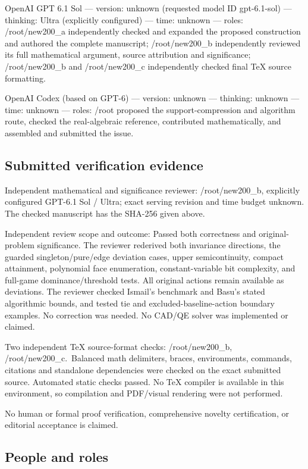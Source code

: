 \documentclass[11pt]{article}
\theoremstyle{remark}
\begin{document}
OpenAI GPT 6.1 Sol  —  version: unknown (requested model ID gpt-6.1-sol)  —  thinking: Ultra (explicitly configured)  —  time: unknown  —  roles: /root/new200\_a independently checked and expanded the proposed construction and authored the complete manuscript; /root/new200\_b independently reviewed its full mathematical argument, source attribution and significance; /root/new200\_b and /root/new200\_c independently checked final TeX source formatting.

OpenAI Codex (based on GPT-6)  —  version: unknown  —  thinking: unknown  —  time: unknown  —  roles: /root proposed the support-compression and algorithm route, checked the real-algebraic reference, contributed mathematically, and assembled and submitted the issue.

\subsection{Submitted verification evidence}

Independent mathematical and significance reviewer: /root/new200\_b, explicitly configured GPT-6.1 Sol / Ultra; exact serving revision and time budget unknown. The checked manuscript has the SHA-256 given above.

Independent review scope and outcome: Passed both correctness and original-problem significance. The reviewer rederived both invariance directions, the guarded singleton/pure/edge deviation cases, upper semicontinuity, compact attainment, polynomial face enumeration, constant-variable bit complexity, and full-game dominance/threshold tests. All original actions remain available as deviations. The reviewer checked Ismail's benchmark and Basu's stated algorithmic bounds, and tested tie and excluded-baseline-action boundary examples. No correction was needed. No CAD/QE solver was implemented or claimed.

Two independent TeX source-format checks: /root/new200\_b, /root/new200\_c.~Balanced math delimiters, braces, environments, commands, citations and standalone dependencies were checked on the exact submitted source. Automated static checks passed. No TeX compiler is available in this environment, so compilation and PDF/visual rendering were not performed.

No human or formal proof verification, comprehensive novelty certification, or editorial acceptance is claimed.

\subsection{People and roles}
\end{document}
